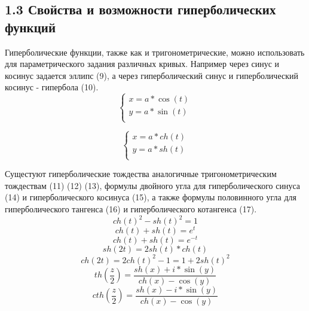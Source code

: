 \subsection*{1.3 Свойства и возможности гиперболических функций}
Гиперболические функции, также как и тригонометрические, можно использовать для параметрического задания различных кривых. Например через синус и косинус задается эллипс (9), а через гиперболический синус и гиперболический косинус - гипербола (10).
\begin{equation}
    \begin{cases}
        x = a * \cos(t)\\
        y = a * \sin(t)\\
    \end{cases}
\end{equation}

\begin{equation}
    \begin{cases}
        x = a * ch(t)\\
        y = a * sh(t)\\
    \end{cases}
\end{equation}

Сущестуют гиперболические тождества аналогичные тригонометрическим тождествам (11) (12) (13), формулы двойного угла для гиперболического синуса (14) и гиперболического косинуса (15), а также формулы половинного угла для гиперболического тангенса (16) и гиперболического котангенса (17).
\begin{equation}
    ch(t)^2 - sh(t)^2 = 1
\end{equation}
\begin{equation}
    ch(t) + sh(t) = e^t
\end{equation}
\begin{equation}
    ch(t) + sh(t) = e^{-t}
\end{equation}
\begin{equation}
    sh(2t) = 2sh(t)*ch(t)
\end{equation}
\begin{equation}
    ch(2t) = 2ch(t)^2 - 1 = 1 + 2sh(t)^2
\end{equation}
\begin{equation}
    th(\frac{z}{2})=\frac{sh(x)+i*\sin(y)}{ch(x)-\cos(y)}
\end{equation}
\begin{equation}
    cth(\frac{z}{2})=\frac{sh(x)-i*\sin(y)}{ch(x)-\cos(y)}
\end{equation}

